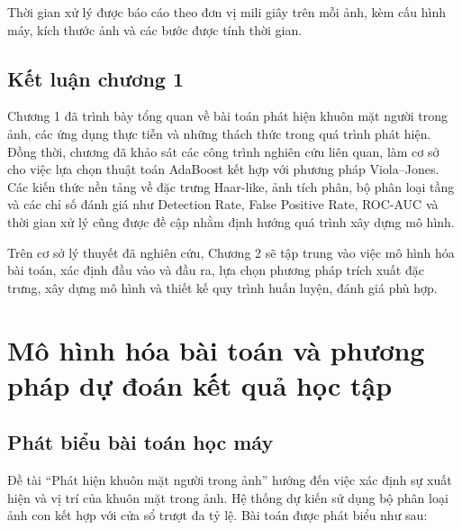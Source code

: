\documentclass[12pt,a4paper,oneside]{report}
\newcommand{\tenbaitoan}{dự đoán kết quả học tập} %
\begin{document}
Thời gian xử lý được báo cáo theo đơn vị mili giây
trên mỗi ảnh, kèm cấu hình máy, kích thước ảnh và
các bước được tính thời gian.

\section{Kết luận chương 1}
{Chương 1 đã trình bày tổng quan về bài toán phát hiện khuôn mặt người trong ảnh, các ứng dụng thực tiễn và những thách thức trong quá trình phát hiện. Đồng thời, chương đã khảo sát các công trình nghiên cứu liên quan, làm cơ sở cho việc lựa chọn thuật toán AdaBoost kết hợp với phương pháp Viola–Jones. Các kiến thức nền tảng về đặc trưng Haar-like, ảnh tích phân, bộ phân loại tầng và các chỉ số đánh giá như Detection Rate, False Positive Rate, ROC-AUC và thời gian xử lý cũng được đề cập nhằm định hướng quá trình xây dựng mô hình.

Trên cơ sở lý thuyết đã nghiên cứu, Chương 2 sẽ tập trung vào việc mô hình hóa bài toán, xác định đầu vào và đầu ra, lựa chọn phương pháp trích xuất đặc trưng, xây dựng mô hình và thiết kế quy trình huấn luyện, đánh giá phù hợp.}

\chapter{Mô hình hóa bài toán và phương pháp \tenbaitoan}
\label{chap:phuongphap}


\section{Phát biểu bài toán học máy}

Đề tài ``Phát hiện khuôn mặt người trong ảnh'' hướng đến việc
xác định sự xuất hiện và vị trí của khuôn mặt trong ảnh.
Hệ thống dự kiến sử dụng bộ phân loại ảnh con kết hợp với
cửa sổ trượt đa tỷ lệ. Bài toán được phát biểu như sau:
\end{document}

